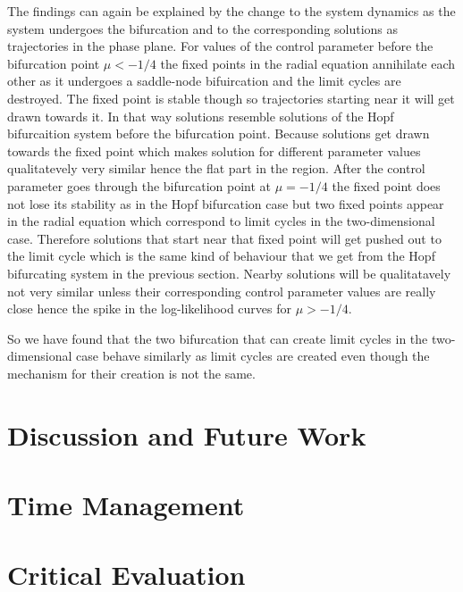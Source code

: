 \documentclass[12pt,a4paper,titlepage]{article}
\begin{document}
The findings can again be explained by the change to the system dynamics as the system undergoes the bifurcation and to the corresponding solutions as trajectories in the phase plane. For values of the control parameter before the bifurcation point $\mu < -1/4$ the fixed points in the radial equation annihilate each other as it undergoes a saddle-node bifuircation and the limit cycles are destroyed. The fixed point is stable though so trajectories starting near it will get drawn towards it. In that way solutions resemble solutions of the Hopf bifurcaition system before the bifurcation point. Because solutions get drawn towards the fixed point which makes solution for different parameter values qualitatevely very similar hence the flat part in the region. After the control parameter goes through the bifurcation point at $\mu=-1/4$ the fixed point does not lose its stability as in the Hopf bifurcation case but two fixed points appear in the radial equation which correspond to limit cycles in the two-dimensional case. Therefore solutions that start near that fixed point will get pushed out to the limit cycle which is the same kind of behaviour that we get from the Hopf bifurcating system in the previous section. Nearby solutions will be qualitatavely not very similar unless their corresponding control parameter values are really close hence the spike in the log-likelihood curves for $\mu > -1/4$.

So we have found that the two bifurcation that can create limit cycles in the two-dimensional case behave similarly as limit cycles are created even though the mechanism for their creation is not the same. 

%







\section{Discussion and Future Work}

\newpage

\appendix
\section{Time Management}
\section{Critical Evaluation}
\end{document}
